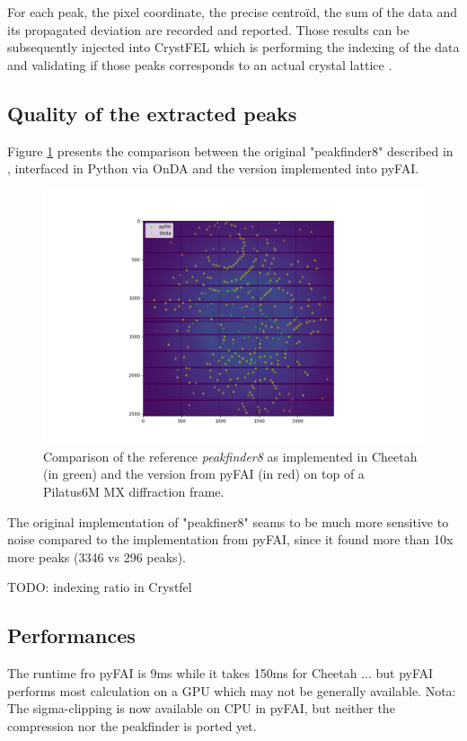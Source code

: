 \documentclass[preprint]{iucr}              %
\begin{document}
For each peak, the pixel coordinate, the precise centroïd, the sum of the data and its propagated deviation are recorded and reported. 
Those results can be subsequently injected into CrystFEL \cite{CrystFEL} which is performing the indexing of
the data and validating if those peaks corresponds to an actual crystal lattice \cite{nanopeakcell}.


\subsection{Quality of the extracted peaks}
Figure \ref{peakfinder} presents the comparison between the original "peakfinder8" described in , interfaced in Python via OnDA \cite{onda} and the version implemented into pyFAI. 

\begin{figure}
\label{peakfinder}
\begin{center}
\includegraphics[width=12cm]{peakfinder}
\caption{Comparison of the reference \textit{peakfinder8} as implemented in Cheetah (in green) and the version from pyFAI (in red) on top of a Pilatus6M MX diffraction frame.}
\end{center}
\end{figure}

The original implementation of "peakfiner8" seams to be much more sensitive to noise compared to the implementation from pyFAI, since it found more than 10x more peaks (3346 vs 296 peaks). 

TODO: indexing ratio in Crystfel

\subsection{Performances}
The runtime fro pyFAI is 9ms while it takes 150ms for Cheetah ... but pyFAI performs most calculation on a GPU which may not be generally available.
Nota: The sigma-clipping is now available on CPU in pyFAI, but neither the compression nor the peakfinder is ported yet.
\end{document}
